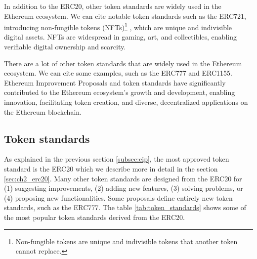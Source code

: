 In addition to the ERC20, other token standards are widely used in the Ethereum ecosystem. We can cite notable token standards
such as the ERC721, introducing non-fungible tokens (NFTs)\footnote{Non-fungible tokens are unique and indivisible tokens that another token cannot replace.}
, which are unique and indivisible digital assets. NFTs are widespread in gaming, art, and collectibles, enabling
verifiable digital ownership and scarcity.


There are a lot of other token standards that are widely used in the Ethereum ecosystem. We can cite some examples, such as the ERC777 and ERC1155.
Ethereum Improvement Proposals and token standards have significantly contributed to the Ethereum ecosystem's growth and development, enabling
innovation, facilitating token creation, and diverse, decentralized applications on the Ethereum blockchain.



\subsection{Token standards}

As explained in the previous section \ref{subsec:eip}, the most approved token standard is the ERC20 which we describe more in detail in the section \ref{sec:ch2_erc20}.
Many other token standards are designed from the ERC20 for (1) suggesting improvements, (2) adding new features, (3) solving problems, or (4) proposing new functionalities.
Some proposals define entirely new token standards, such as the ERC777. The table \ref{tab:token_standards} shows some of the most popular token standards derived from the ERC20.

